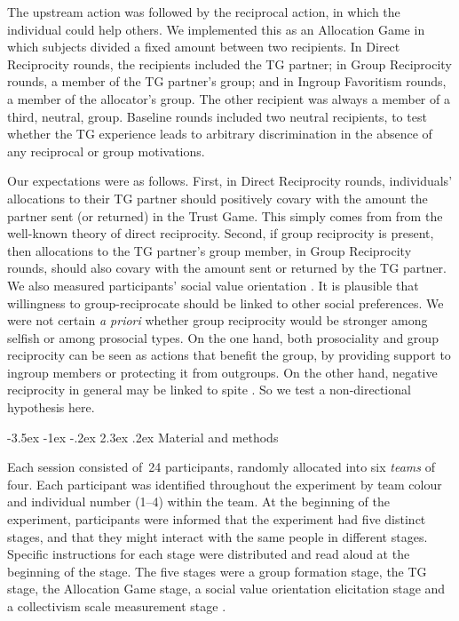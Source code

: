 \documentclass[12pt,a4paper]{article}\usepackage[]{graphicx}\usepackage[]{color}
\makeatletter
\renewcommand\section{\@startsection {section}{1}{\z@}%
{-3.5ex \@plus -1ex \@minus -.2ex}%
{2.3ex \@plus.2ex}%
{\bf\sffamily\Large}}
\makeatother
\begin{document}
The upstream action was followed by the reciprocal action, 
in which the individual could help others. We implemented this as an Allocation
Game in which subjects divided a fixed amount between two recipients.
In Direct Reciprocity rounds, the recipients included the TG partner;
in Group Reciprocity rounds, a member of the TG partner's group; and
in Ingroup Favoritism rounds, a member of the allocator's group.
The other recipient was always a member of a third, neutral, group.
Baseline rounds included two neutral recipients, to test whether the
TG experience leads to arbitrary discrimination in the absence of any reciprocal
or group motivations.

Our expectations were as follows. First, in Direct Reciprocity rounds, individuals' allocations to their TG partner
should positively covary with the amount the partner sent (or returned) in the Trust Game. This simply comes from
from the well-known theory of direct reciprocity. Second, if group reciprocity is present, then allocations to the TG partner's group member, in Group Reciprocity rounds, should also covary with the amount sent or returned by the TG partner.
We also measured participants' social value orientation \citep{van1999pursuit}. It is plausible that willingness to group-reciprocate should
be linked to other social preferences. We were not certain \emph{a priori} whether group reciprocity would be stronger
among selfish or among prosocial types. On the one hand, both prosociality and group reciprocity can be seen as actions
that benefit the group, by providing support to ingroup members or protecting it from outgroups. On the other hand,
negative reciprocity in general may be linked to spite \citep{johnstone2004evolution}. So we test a non-directional hypothesis here.

\section{Material and methods}
\label{sec:design}

Each session consisted of~24 participants, randomly allocated into six
\emph{teams} of four. Each participant was identified throughout the experiment
by team colour and individual number (1--4) within the team. At the beginning of
the experiment, participants were informed that the experiment had five distinct
stages, and that they might interact with the same people in different stages.
Specific instructions for each stage were distributed and read aloud at the
beginning of the stage. The five stages were a group formation stage, the TG
stage, the Allocation Game stage, a social value orientation elicitation stage
\citep*{murphy2011measuring} and a collectivism scale measurement stage
\citep*[adapted from the horizontal collectivism scale
in][]{Singelis1995horizontal}.
\end{document}
